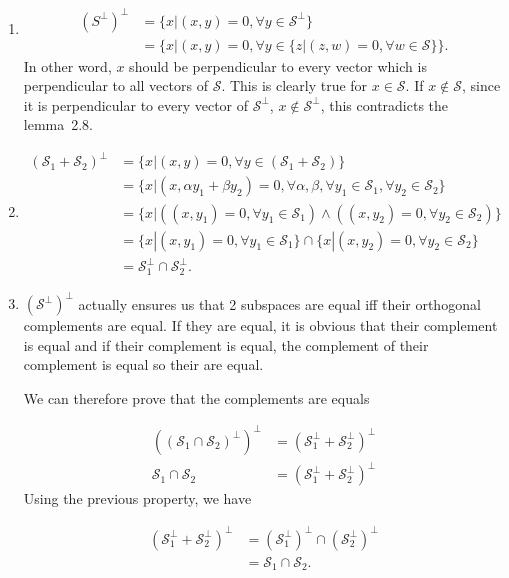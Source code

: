 \begin{solution}
  \begin{enumerate}
    \item
      \begin{align*}
        (S^\perp)^\perp
        & = \{x | (x,y) = 0, \forall y \in \mathcal{S}^\perp\}\\
        & = \{x | (x,y) = 0, \forall y \in \{z | (z,w) = 0, \forall w \in \mathcal{S}\}\}.
      \end{align*}
      In other word, $x$ should be perpendicular to every vector which is perpendicular to all vectors of $\mathcal{S}$.
      This is clearly true for $x \in \mathcal{S}$.
      If $x \notin \mathcal{S}$, since it is perpendicular to every vector of $\mathcal{S}^\perp$, $x \notin \mathcal{S}^\perp$,
      this contradicts the lemma~2.8.
    \item
      \begin{align*}
        (\mathcal{S}_1 + \mathcal{S}_2)^\perp
        & = \{x | (x,y) = 0, \forall y \in (\mathcal{S}_1+\mathcal{S}_2)\}\\
        & = \{x | (x,\alpha y_1 + \beta y_2) = 0, \forall \alpha,\beta, \forall y_1 \in \mathcal{S}_1, \forall y_2 \in \mathcal{S}_2\}\\
        & = \{x | ((x, y_1) = 0, \forall y_1 \in \mathcal{S}_1) \land ((x, y_2) = 0, \forall y_2 \in \mathcal{S}_2)\}\\
        & = \{x | (x, y_1) = 0, \forall y_1 \in \mathcal{S}_1\} \cap \{x | (x, y_2) = 0, \forall y_2 \in \mathcal{S}_2\}\\
        & = \mathcal{S}_1^\perp \cap \mathcal{S}_2^\perp.
      \end{align*}
    \item
      $(\mathcal{S}^\perp)^\perp$ actually ensures us that
      2 subspaces are equal iff their orthogonal complements are equal.
      If they are equal, it is obvious that their complement is equal
      and if their complement is equal, the complement of their complement is equal so their are equal.

      We can therefore prove that the complements are equals

      \begin{align*}
        ((\mathcal{S}_1 \cap \mathcal{S}_2)^\perp)^\perp
        & = (\mathcal{S}_1^\perp + \mathcal{S}_2^\perp)^\perp\\
        \mathcal{S}_1 \cap \mathcal{S}_2
        & = (\mathcal{S}_1^\perp + \mathcal{S}_2^\perp)^\perp
      \end{align*}
      Using the previous property, we have

      \begin{align*}
        (\mathcal{S}_1^\perp + \mathcal{S}_2^\perp)^\perp
        & = (\mathcal{S}_1^\perp)^\perp \cap (\mathcal{S}_2^\perp)^\perp\\
        & = \mathcal{S}_1 \cap \mathcal{S}_2.
      \end{align*}
  \end{enumerate}
\end{solution}

